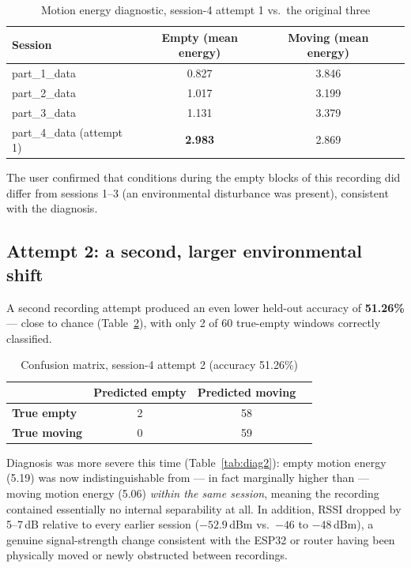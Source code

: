 \documentclass[11pt,a4paper]{article}
\begin{document}
\begin{table}[h]
\centering
\begin{tabular}{lccc}
\toprule
\textbf{Session} & \textbf{Empty (mean energy)} & \textbf{Moving (mean energy)} \\
\midrule
part\_1\_data & 0.827 & 3.846 \\
part\_2\_data & 1.017 & 3.199 \\
part\_3\_data & 1.131 & 3.379 \\
part\_4\_data (attempt 1) & \textbf{2.983} & 2.869 \\
\bottomrule
\end{tabular}
\caption{Motion energy diagnostic, session-4 attempt 1 vs.\ the original three}
\label{tab:diag1}
\end{table}

The user confirmed that conditions during the empty blocks of this
recording did differ from sessions 1--3 (an environmental disturbance
was present), consistent with the diagnosis.

\subsection{Attempt 2: a second, larger environmental shift}

A second recording attempt produced an even lower held-out accuracy of
\textbf{51.26\%} --- close to chance (Table~\ref{tab:holdout2}), with
only 2 of 60 true-empty windows correctly classified.

\begin{table}[h]
\centering
\begin{tabular}{lccc}
\toprule
 & \textbf{Predicted empty} & \textbf{Predicted moving} \\
\midrule
\textbf{True empty}  & 2  & 58 \\
\textbf{True moving} & 0  & 59 \\
\bottomrule
\end{tabular}
\caption{Confusion matrix, session-4 attempt 2 (accuracy 51.26\%)}
\label{tab:holdout2}
\end{table}

Diagnosis was more severe this time (Table~\ref{tab:diag2}): empty
motion energy (5.19) was now indistinguishable from --- in fact
marginally higher than --- moving motion energy (5.06) \emph{within the
same session}, meaning the recording contained essentially no internal
separability at all. In addition, RSSI dropped by 5--7\,dB relative to
every earlier session ($-52.9$\,dBm vs.\ $-46$ to $-48$\,dBm), a
genuine signal-strength change consistent with the ESP32 or router
having been physically moved or newly obstructed between recordings.
\end{document}
